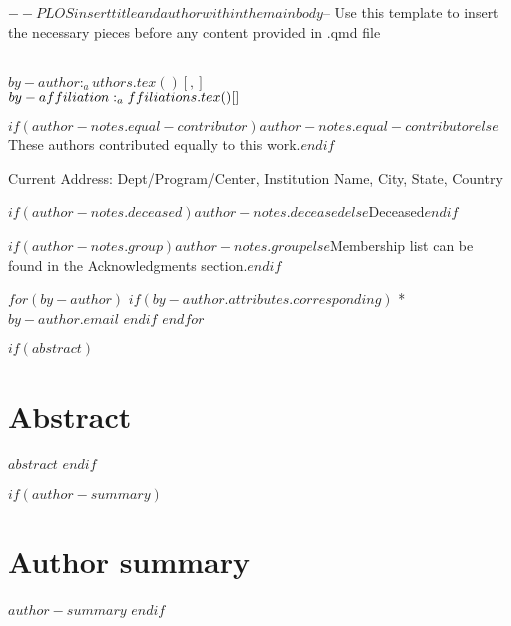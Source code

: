 $-- PLOS insert title and author within the main body
$-- Use this template to insert the necessary pieces before any content provided in .qmd file
\vspace*{0.2in}

\begin{flushleft}
{\Large
\textbf{} %
}
\newline
\\
$by-author:_authors.tex()[, ]$
\\
\bigskip
$by-affiliation:_affiliations.tex()[\\ ]$
\bigskip

% 
%
\Yinyang $if(author-notes.equal-contributor)$$author-notes.equal-contributor$$else$These authors contributed equally to this work.$endif$


\textcurrency Current Address: Dept/Program/Center, Institution Name, City, State, Country %

\dag $if(author-notes.deceased)$$author-notes.deceased$$else$Deceased$endif$

\textpilcrow $if(author-notes.group)$$author-notes.group$$else$Membership list can be found in the Acknowledgments section.$endif$

$for(by-author)$
$if(by-author.attributes.corresponding)$
* $by-author.email$
$endif$
$endfor$

\end{flushleft}

$if(abstract)$
\section*{Abstract}
$abstract$
$endif$

$if(author-summary)$
\section*{Author summary}
$author-summary$
$endif$

\linenumbers